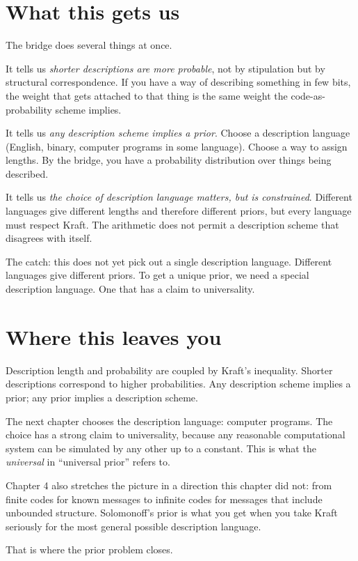 \section*{What this gets us}

The bridge does several things at once.

It tells us \emph{shorter descriptions are more probable}, not by stipulation but by structural correspondence. If you have a way of describing something in few bits, the weight that gets attached to that thing is the same weight the code-as-probability scheme implies.

It tells us \emph{any description scheme implies a prior}. Choose a description language (English, binary, computer programs in some language). Choose a way to assign lengths. By the bridge, you have a probability distribution over things being described.

It tells us \emph{the choice of description language matters, but is constrained}. Different languages give different lengths and therefore different priors, but every language must respect Kraft. The arithmetic does not permit a description scheme that disagrees with itself.

The catch: this does not yet pick out a single description language. Different languages give different priors. To get a unique prior, we need a special description language. One that has a claim to universality.

\section*{Where this leaves you}

Description length and probability are coupled by Kraft's inequality. Shorter descriptions correspond to higher probabilities. Any description scheme implies a prior; any prior implies a description scheme.

The next chapter chooses the description language: computer programs. The choice has a strong claim to universality, because any reasonable computational system can be simulated by any other up to a constant. This is what the \emph{universal} in ``universal prior'' refers to.

Chapter 4 also stretches the picture in a direction this chapter did not: from finite codes for known messages to infinite codes for messages that include unbounded structure. Solomonoff's prior is what you get when you take Kraft seriously for the most general possible description language.

That is where the prior problem closes.
